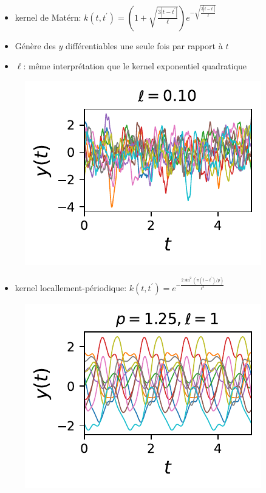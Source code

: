 \documentclass[xcolor=svgnames, t]{beamer}
\begin{document}
\begin{frame}{\subsecname}
  
  \begin{itemize}
    \item kernel de Matérn:
    $k (t, t^\prime) = ( 1 + \sqrt{\frac{3 |t - t^\prime|}{\ell} } ) e^{-\sqrt{\frac{3 |t - t^\prime|}{\ell} }}$
    \item Génère des $y$ différentiables une seule fois par rapport à $t$
    \item $\ell$: même interprétation que le kernel exponentiel quadratique
  \end{itemize}
  \begin{figure}
    \includegraphics{10_gp_time_MaternKernel_0.10.pdf}
  \end{figure}
\end{frame}

\begin{frame}{\subsecname}
  
  \begin{itemize}
    \item kernel locallement-périodique:
    $k (t, t^\prime) = e^{- \frac{2 \sin^2(\pi (t - t^\prime) / p)}{\ell^2}}$ %
  \end{itemize}
  \begin{figure}
    \includegraphics{10_gp_time_PeriodicKernel_1.25.pdf}
  \end{figure}
\end{frame}
\end{document}
